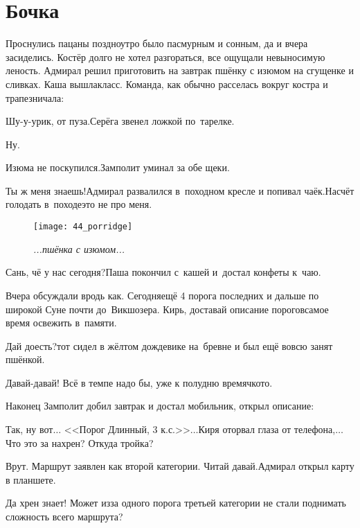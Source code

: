 \chapter{Бочка}
\vepsianrose

Проснулись пацаны поздно\mdash утро было пасмурным и сонным, да и вчера засиделись. Костёр долго не хотел разгораться, все ощущали невыносимую леность. Адмирал решил приготовить на завтрак пшёнку с изюмом на сгущенке и сливках. Каша вышла\mdash класс. Команда, как обычно расселась вокруг костра и трапезничала:

\diagdash Шу-у-урик, от пуза.\mdash Серёга звенел ложкой по~тарелке.

\diagdash Ну.

\diagdash Изюма не поскупился.\mdash Замполит уминал за обе щеки.

\diagdash Ты ж меня знаешь!\mdash Адмирал развалился в~походном кресле и попивал чаёк.\mdash Насчёт голодать в~походе\mdash это не про меня.

\begin{wrapfigure}[12]{l}{0.48\textwidth}
	\centering
	\texttt{[image: 44\_porridge]}
	\caption{\small\textit{...пшёнка с изюмом...}}
\end{wrapfigure}
\diagdash Сань, чё у нас сегодня?\mdash Паша покончил с~кашей и~достал конфеты к~чаю.

\diagdash Вчера обсуждали вродь как. Сегодня\mdash ещё 4 порога последних и дальше по широкой Суне почти до~Викшозера. Кирь, доставай описание порогов\mdash самое время освежить в~памяти.

\diagdash Дай доесть?\mdash тот сидел в жёлтом дождевике на~бревне и был ещё вовсю занят пшёнкой.

\diagdash Давай-давай! Всё в темпе надо бы, уже к полудню времячко\sdash то.

Наконец Замполит добил завтрак и достал мобильник, открыл описание:

\diagdash Так, ну вот$\ldots$ <<Порог Длинный, 3 к.с.>>$\ldots$\mdash Киря оторвал глаза от телефона,\mdash $\ldots$Что это за нахрен? Откуда тройка?

\diagdash Врут. Маршрут заявлен как второй категории. Читай давай.\mdash Адмирал открыл карту в планшете.

\diagdash Да хрен знает! Может из\sdash за одного порога третьей категории не стали поднимать сложность всего маршрута? 

